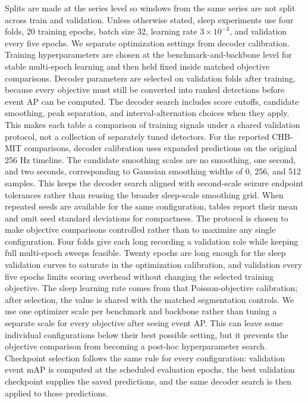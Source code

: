 Splits are made at the series level so windows from the same series are not split across train and validation.
Unless otherwise stated, sleep experiments use four folds, 20 training epochs, batch size 32, learning rate $3\times10^{-3}$, and validation every five epochs.
We separate optimization settings from decoder calibration.
Training hyperparameters are chosen at the benchmark-and-backbone level for stable multi-epoch learning and then held fixed inside matched objective comparisons.
Decoder parameters are selected on validation folds after training, because every objective must still be converted into ranked detections before event AP can be computed.
The decoder search includes score cutoffs, candidate smoothing, peak separation, and interval-alternation choices when they apply.
This makes each table a comparison of training signals under a shared validation protocol, not a collection of separately tuned detectors.
For the reported CHB-MIT comparisons, decoder calibration uses expanded predictions on the original 256 Hz timeline.
The candidate smoothing scales are no smoothing, one second, and two seconds, corresponding to Gaussian smoothing widths of 0, 256, and 512 samples.
This keeps the decoder search aligned with second-scale seizure endpoint tolerances rather than reusing the broader sleep-scale smoothing grid.
When repeated seeds are available for the same configuration, tables report their mean and omit seed standard deviations for compactness.
The protocol is chosen to make objective comparisons controlled rather than to maximize any single configuration.
Four folds give each long recording a validation role while keeping full multi-epoch sweeps feasible.
Twenty epochs are long enough for the sleep validation curves to saturate in the optimization calibration, and validation every five epochs limits scoring overhead without changing the selected training objective.
The sleep learning rate comes from that Poisson-objective calibration; after selection, the value is shared with the matched segmentation controls.
We use one optimizer scale per benchmark and backbone rather than tuning a separate scale for every objective after seeing event AP.
This can leave some individual configurations below their best possible setting, but it prevents the objective comparison from becoming a post-hoc hyperparameter search.
Checkpoint selection follows the same rule for every configuration: validation event mAP is computed at the scheduled evaluation epochs, the best validation checkpoint supplies the saved predictions, and the same decoder search is then applied to those predictions.
